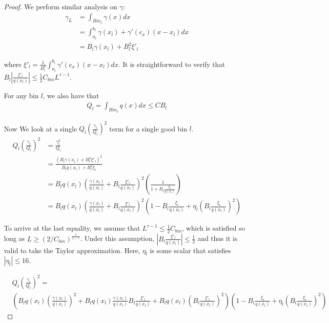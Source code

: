 \begin{proof}
We perform similar analysis on $\gamma$:
\begin{align*}
\gamma_L &= \int_{Bin_l} \gamma(x) dx \\
     &=  \int_{a_l}^{b_l} \gamma(x_l) + \gamma'(c_x) (x - x_l) dx  \\
     &= B_l \gamma(x_l) + B_l^2 \xi'_l
\end{align*}  

where $\xi'_l = \frac{1}{B_l^2} \int_{a_l}^{b_l} \gamma'(c_x)(x - x_l) dx$. It is straightforward to verify that
 $ B_l \left| \frac{\xi'_l}{q(x_l)}\right| \leq \frac{1}{2} C_{bin} L^{\tau - 1}$. 

For any bin $l$, we also have that
\begin{align*}
Q_l = \int_{Bin_l} q(x) dx \leq C B_l
\end{align*}

Now We look at a single $Q_l \left( \frac{\gamma_l}{Q_l} \right)^2$ term for a single good bin $l$. 
\begin{align*}
Q_l \left( \frac{\gamma_l}{Q_l} \right)^2 &= \frac{\gamma_l^2}{Q_l} \\
   &= \frac{ (B_l \gamma(x_l) + B_l^2 \xi'_l)^2}{B_l q(x_l) + B_l^2 \xi_l} \\
   &= B_l q(x_l) \left( \frac{\gamma(x_l)}{q(x_l)} + B_l \frac{\xi'_l}{q(x_l)} \right)^2 
         \left( \frac{1}{1 + B_l \frac{\xi_l}{q(x_l)} } \right) \\
   &=  B_l q(x_l) \left( \frac{\gamma(x_l)}{q(x_l)} + B_l \frac{\xi'_l}{q(x_l)} \right)^2 
         \left( 1 - B_l \frac{\xi_l}{q(x_l)} + \eta_l ( B_l \frac{\xi_l}{q(x_l)} )^2 \right)
\end{align*}

To arrive at the last equality, we assume that $L^{\tau-1} \leq \frac{1}{2} C_{bin}$, which is satisfied so long as $L \geq (2/C_{bin})^{\frac{1}{1-\tau}}$. Under this assumption, $\left| B_l \frac{\xi'_l}{q(x_l)} \right| \leq \frac{1}{2}$ and thus it is valid to take the Taylor approximation. Here, $\eta_l$ is some scalar that satisfies $|\eta_l| \leq 16$.

\begin{align*}
& Q_l \left( \frac{\gamma_l}{Q_l} \right)^2 =  \\
 &  \left( B_l q(x_l) \left( \frac{\gamma(x_l)}{q(x_l)} \right)^2 + 
          B_l q(x_l) \frac{\gamma(x_l)}{q(x_l)} B_l \frac{\xi'_l}{q(x_l)} +
          B_l q(x_l) \left( B_l \frac{\xi'_l}{q(x_l)} \right)^2 \right) 
       \left( 1 - B_l \frac{\xi_l}{q(x_l)} + \eta_l ( B_l \frac{\xi_l}{q(x_l)} )^2 \right)
\end{align*}



\end{proof}
